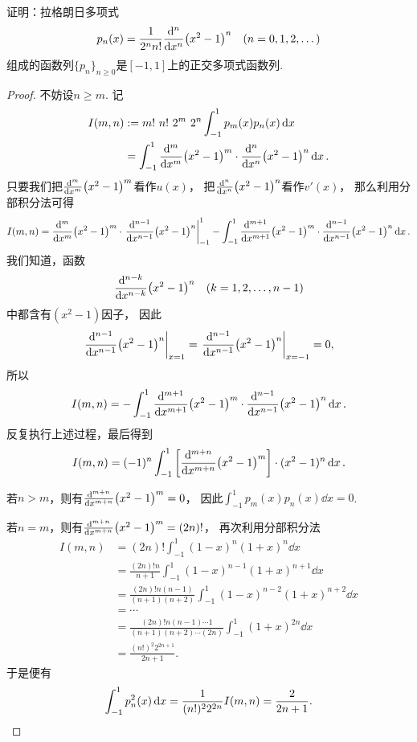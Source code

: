 \begin{example}
证明：拉格朗日多项式\[
	p_n(x) = \frac1{2^n n!} \dv[n]{x} (x^2-1)^n
	\quad(n=0,1,2,\dotsc)
\]组成的函数列\(\{p_n\}_{n\geq0}\)是\([-1,1]\)上的正交多项式函数列.
\begin{proof}
不妨设\(n \geq m\).
记\begin{align*}
	I(m,n) &:= m! ~ n! ~ 2^m ~ 2^n \int_{-1}^1 p_m(x) p_n(x) \dd{x} \\
	&= \int_{-1}^1 \dv[m]{x} (x^2-1)^m \cdot \dv[n]{x} (x^2-1)^n \dd{x}.
\end{align*}
只要我们把\(\dv[m]{x} (x^2-1)^m\)看作\(u(x)\)，
把\(\dv[n]{x} (x^2-1)^n\)看作\(v'(x)\)，
那么利用分部积分法可得\begin{align*}
	I(m,n) = \dv[m]{x} (x^2-1)^m
		\cdot \eval{\dv[n-1]{x} (x^2-1)^n}_{-1}^1
		- \int_{-1}^1 \dv[m+1]{x} (x^2-1)^m
			\cdot \dv[n-1]{x} (x^2-1)^n \dd{x}.
\end{align*}
我们知道，函数\[
	\dv[n-k]{x} (x^2-1)^n
	\quad(k=1,2,\dotsc,n-1)
\]中都含有\((x^2-1)\)因子，
因此\[
	\eval{\dv[n-1]{x} (x^2-1)^n}_{x=1}
	= \eval{\dv[n-1]{x} (x^2-1)^n}_{x=-1}
	= 0,
\]
所以\[
	I(m,n) = - \int_{-1}^1 \dv[m+1]{x} (x^2-1)^m
					\cdot \dv[n-1]{x} (x^2-1)^n \dd{x}.
\]
反复执行上述过程，最后得到\[
	I(m,n) = (-1)^n \int_{-1}^1 \left[\dv[m+n]{x} (x^2-1)^m\right] \cdot (x^2-1)^n \dd{x}.
\]

若\(n>m\)，则有\(\dv[m+n]{x} (x^2-1)^m = 0\)，
因此\(\int_{-1}^1 p_m(x) p_n(x) \dd{x} = 0\).

若\(n=m\)，则有\(\dv[m+n]{x} (x^2-1)^m = (2n)!\)，
再次利用分部积分法\begin{align*}
	I(m,n) &= (2n)! \int_{-1}^1 (1-x)^n (1+x)^n \dd{x} \\
	&= \frac{(2n)! n}{n+1} \int_{-1}^1 (1-x)^{n-1} (1+x)^{n+1} \dd{x} \\
	&= \frac{(2n)! n(n-1)}{(n+1)(n+2)} \int_{-1}^1 (1-x)^{n-2} (1+x)^{n+2} \dd{x} \\
	&= \dotsb \\
	&= \frac{(2n)! n(n-1)\dotsm1}{(n+1)(n+2)\dotsm(2n)} \int_{-1}^1 (1+x)^{2n} \dd{x} \\
	&= \frac{(n!)^2 2^{2n+1}}{2n+1}.
\end{align*}
于是便有\[
	\int_{-1}^1 p_n^2(x) \dd{x}
	= \frac1{(n!)^2 2^{2n}} I(m,n)
	= \frac2{2n+1}.
	\qedhere
\]
\end{proof}
\end{example}

